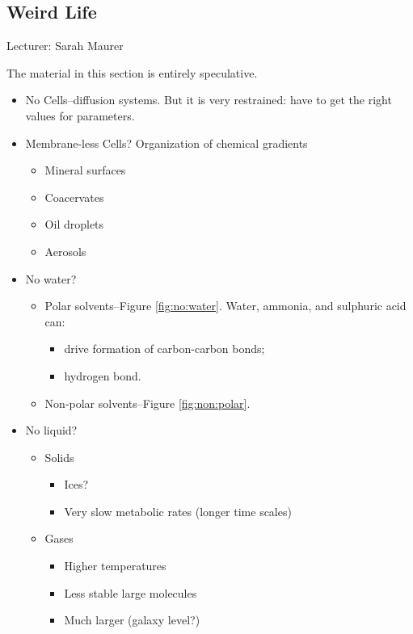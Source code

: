 \documentclass[]{article}
\begin{document}
\subsection{Weird Life}

Lecturer: Sarah Maurer

The material in this section is entirely speculative.

\begin{itemize}
	\item No Cells--diffusion systems. But it is very restrained: have to get the right values for parameters.
	\item Membrane-less Cells? Organization of 	chemical gradients\cite{hollants2011life}\cite{kim2001life}
	\begin{itemize}
		\item Mineral surfaces
		\item Coacervates
		\item Oil droplets
		\item Aerosols
	\end{itemize}
	\item No water? 
	\begin{itemize}
		\item Polar solvents\cite[Chapter 6]{board2007limits}--Figure \ref{fig:no:water}. Water, ammonia, and sulphuric acid can:
		\begin{itemize}
			\item drive formation of carbon-carbon bonds;
			\item hydrogen bond.
		\end{itemize}
		\item Non-polar solvents\cite{cejkova2014dynamics}--Figure \ref{fig:non:polar}.
	\end{itemize}
	\item No liquid?\cite[Chapter 6]{board2007limits}
	\begin{itemize}
		\item Solids
		\begin{itemize}
			\item Ices?
			\item Very slow metabolic rates (longer time scales)
		\end{itemize}
		\item Gases
		\begin{itemize}
			\item Higher temperatures
			\item Less stable large molecules
			\item Much larger (galaxy level?)
		\end{itemize}
	\end{itemize}
\end{itemize}
\end{document}
